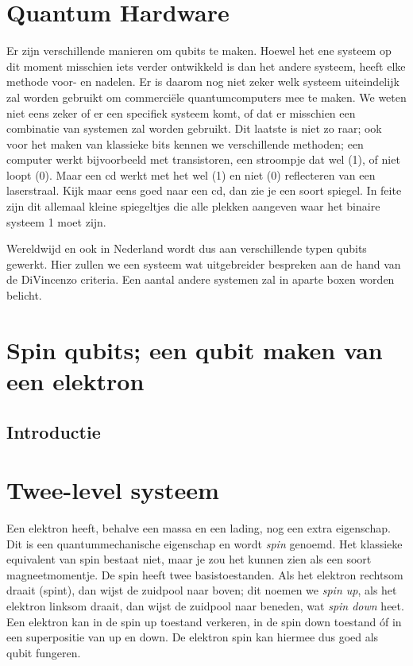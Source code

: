 \documentclass[../../main.tex]{subfiles}
\begin{document}
\section{Quantum Hardware}
Er zijn verschillende manieren om qubits te maken. Hoewel het ene systeem op dit moment misschien iets verder ontwikkeld is dan het andere systeem, heeft elke methode voor- en nadelen. Er is daarom nog niet zeker welk systeem uiteindelijk zal worden gebruikt om commerci\"ele quantumcomputers mee te maken. We weten niet eens zeker of er een specifiek systeem komt, of dat er misschien een combinatie van systemen zal worden gebruikt. Dit laatste is niet zo raar; ook voor het maken van klassieke bits kennen we verschillende methoden; een computer werkt bijvoorbeeld met transistoren, een stroompje dat wel (1), of niet loopt (0). Maar een cd werkt met het wel (1) en niet (0) reflecteren van een laserstraal. Kijk maar eens goed naar een cd, dan zie je een soort spiegel. In feite zijn dit allemaal kleine spiegeltjes die alle plekken aangeven waar het binaire systeem 1 moet zijn.

Wereldwijd en ook in Nederland wordt dus aan verschillende typen qubits gewerkt. Hier zullen we een systeem wat uitgebreider bespreken aan de hand van de DiVincenzo criteria. Een aantal andere systemen zal in aparte boxen worden belicht.


\section{Spin qubits; een qubit maken van een elektron}
\subsection{Introductie}



\section{Twee-level systeem}
Een elektron heeft, behalve een massa en een lading, nog een extra eigenschap. Dit is een quantummechanische eigenschap en wordt \textit{spin} genoemd. Het klassieke equivalent van spin bestaat niet, maar je zou het kunnen zien als een soort magneetmomentje. De spin heeft twee basistoestanden. Als het elektron rechtsom draait (spint), dan wijst de zuidpool naar boven; dit noemen we \textit{spin up}, als het elektron linksom draait, dan wijst de zuidpool naar beneden, wat \textit{spin down} heet. Een elektron kan in de spin up toestand verkeren, in de spin down toestand \'of in een superpositie van up en down. De elektron spin kan hiermee dus goed als qubit fungeren.
\end{document}
